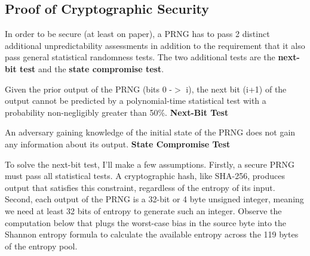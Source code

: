 \documentclass[titlepage]{article}
\begin{document}
		\subsection{Proof of Cryptographic Security}
			In order to be secure (at least on paper), a PRNG has to pass 2 distinct additional unpredictability assessments in addition to the requirement that it also pass general statistical randomness tests. The two additional tests are the \textbf{next-bit test} and the \textbf{state compromise test}.
				\begin{newquote}
					Given the prior output of the PRNG (bits 0 -$>$ i), the next bit (i+1) of the output cannot be predicted by a polynomial-time statistical test with a probability non-negligibly greater than 50\%.
					\tcblower
					\textbf{Next-Bit Test}
			\end{newquote}
			\begin{newquote} 
					An adversary gaining knowledge of the initial state of the PRNG does not gain any information about its output.
					\tcblower
					\textbf{State Compromise Test}
			\end{newquote}
			To solve the next-bit test, I'll make a few assumptions. Firstly, a secure PRNG must pass all statistical tests. A cryptographic hash, like SHA-256, produces output that satisfies this constraint, regardless of the entropy of its input. Second, each output of the PRNG is a 32-bit or 4 byte unsigned integer, meaning we need at least 32 bits of entropy to generate such an integer. Observe the computation below that plugs the worst-case bias in the source byte into the Shannon entropy formula to calculate the available entropy across the 119 bytes of the entropy pool.
\end{document}
